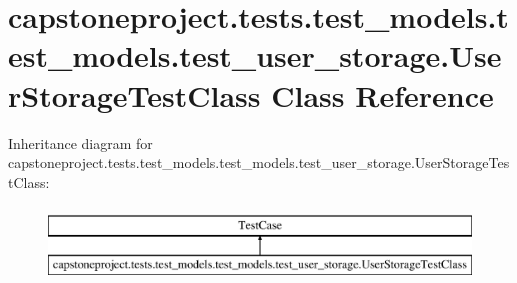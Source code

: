 \hypertarget{classcapstoneproject_1_1tests_1_1test__models_1_1test__models_1_1test__user__storage_1_1_user_storage_test_class}{}\section{capstoneproject.\+tests.\+test\+\_\+models.\+test\+\_\+models.\+test\+\_\+user\+\_\+storage.\+User\+Storage\+Test\+Class Class Reference}
\label{classcapstoneproject_1_1tests_1_1test__models_1_1test__models_1_1test__user__storage_1_1_user_storage_test_class}
Inheritance diagram for capstoneproject.\+tests.\+test\+\_\+models.\+test\+\_\+models.\+test\+\_\+user\+\_\+storage.\+User\+Storage\+Test\+Class\+:\begin{figure}[H]
\begin{center}
\leavevmode
\includegraphics[height=2.000000cm]{classcapstoneproject_1_1tests_1_1test__models_1_1test__models_1_1test__user__storage_1_1_user_storage_test_class}
\end{center}
\end{figure}
